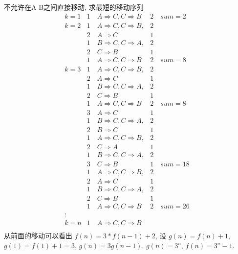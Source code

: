 \begin{answer}
	不允许在A B之间直接移动, 求最短的移动序列
	\begin{equation*}
	\begin{array}{cll}
		k=1     & 1\quad A \Rightarrow C, C \Rightarrow B   & 2 \quad sum=2\\
		k=2     & 1\quad A \Rightarrow C, C \Rightarrow B,  & 2	\\
				& 2\quad A \Rightarrow C                 		& 1	\\
			 	& 1\quad B \Rightarrow C, C \Rightarrow A,  & 2	\\
			 	& 2\quad C \Rightarrow B						& 1	\\
			 	& 1\quad A \Rightarrow C, C \Rightarrow B   & 2 \quad sum=8 \\
		k=3     & 1\quad A \Rightarrow C, C \Rightarrow B,  & 2	\\
				& 2\quad A \Rightarrow C                 		& 1	\\
				& 1\quad B \Rightarrow C, C \Rightarrow A,  & 2	\\
				& 2\quad C \Rightarrow B						& 1	\\
				& 1\quad A \Rightarrow C, C \Rightarrow B   & 2 \quad sum=8\\
				& 3\quad A \Rightarrow C                 		& 1	\\
				& 1\quad B \Rightarrow C, C \Rightarrow A,  & 2	\\
				& 2\quad B \Rightarrow C						& 1	\\
				& 1\quad A \Rightarrow C, C \Rightarrow B,  & 2	\\
				& 2\quad C \Rightarrow A						& 1	\\
				& 1\quad B \Rightarrow C, C \Rightarrow A,  & 2	\\
				& 3\quad C \Rightarrow B						& 1	\quad sum=18\\
				& 1\quad A \Rightarrow C, C \Rightarrow B,  & 2	\\
				& 2\quad A \Rightarrow C                 		& 1	\\
				& 1\quad B \Rightarrow C, C \Rightarrow A,  & 2	\\
				& 2\quad C \Rightarrow B						& 1	\\
				& 1\quad A \Rightarrow C, C \Rightarrow B   & 2 \quad sum=26\\
		\vdots  &													& \\
		k=n     & 1\quad A \Rightarrow C, C \Rightarrow B	&  \\
	\end{array}
	\end{equation*}
	从前面的移动可以看出 $ f(n) = 3*f(n-1)+2 $, 设 $ g(n) = f(n)+1 $, $ g(1)=f(1)+1 = 3 $, $ g(n) = 3g(n-1) $. $ g(n) = 3^{n} $, $ f(n) = 3^{n}-1 $.
\end{answer}

